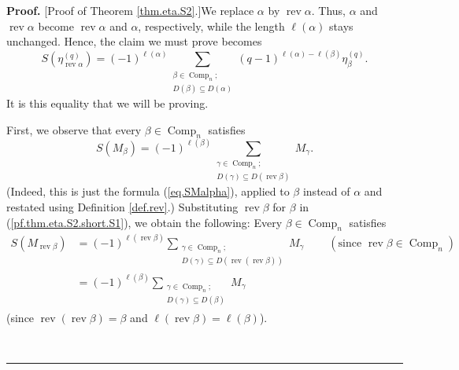 \documentclass[numbers=enddot,12pt,final,onecolumn,notitlepage]{scrartcl}%
\theoremstyle{definition}
\newenvironment{proof}[1][Proof]{\noindent\textbf{#1.} }{\ \rule{0.5em}{0.5em}}
\let\sumnonlimits\sum
\renewcommand{\sum}{\sumnonlimits\limits}
\newenvironment{vershort}{}{}
\begin{document}
\begin{vershort}


\begin{proof}
[Proof of Theorem \ref{thm.eta.S2}.]We replace $\alpha$ by
$\operatorname*{rev}\alpha$. Thus, $\alpha$ and $\operatorname*{rev}\alpha$
become $\operatorname*{rev}\alpha$ and $\alpha$, respectively, while the
length $\ell\left(  \alpha\right)  $ stays unchanged. Hence, the claim we must
prove becomes%
\begin{equation}
S\left(  \eta_{\operatorname*{rev}\alpha}^{\left(  q\right)  }\right)
=\left(  -1\right)  ^{\ell\left(  \alpha\right)  }\sum_{\substack{\beta
\in\operatorname*{Comp}\nolimits_{n};\\D\left(  \beta\right)  \subseteq
D\left(  \alpha\right)  }}\left(  q-1\right)  ^{\ell\left(  \alpha\right)
-\ell\left(  \beta\right)  }\eta_{\beta}^{\left(  q\right)  }.
\label{pf.thm.eta.S2.short.goal}%
\end{equation}
It is this equality that we will be proving.

First, we observe that every $\beta\in\operatorname*{Comp}\nolimits_{n}$
satisfies%
\begin{equation}
S\left(  M_{\beta}\right)  =\left(  -1\right)  ^{\ell\left(  \beta\right)
}\sum_{\substack{\gamma\in\operatorname*{Comp}\nolimits_{n};\\D\left(
\gamma\right)  \subseteq D\left(  \operatorname*{rev}\beta\right)  }%
}M_{\gamma}. \label{pf.thm.eta.S2.short.S1}%
\end{equation}
(Indeed, this is just the formula (\ref{eq.SMalpha}), applied to $\beta$
instead of $\alpha$ and restated using Definition \ref{def.rev}.) Substituting
$\operatorname*{rev}\beta$ for $\beta$ in (\ref{pf.thm.eta.S2.short.S1}), we
obtain the following: Every $\beta\in\operatorname*{Comp}\nolimits_{n}$
satisfies%
\begin{align}
S\left(  M_{\operatorname*{rev}\beta}\right)   &  =\left(  -1\right)
^{\ell\left(  \operatorname*{rev}\beta\right)  }\sum_{\substack{\gamma
\in\operatorname*{Comp}\nolimits_{n};\\D\left(  \gamma\right)  \subseteq
D\left(  \operatorname*{rev}\left(  \operatorname*{rev}\beta\right)  \right)
}}M_{\gamma}\ \ \ \ \ \ \ \ \ \ \left(  \text{since }\operatorname*{rev}%
\beta\in\operatorname*{Comp}\nolimits_{n}\right) \nonumber\\
&  =\left(  -1\right)  ^{\ell\left(  \beta\right)  }\sum_{\substack{\gamma
\in\operatorname*{Comp}\nolimits_{n};\\D\left(  \gamma\right)  \subseteq
D\left(  \beta\right)  }}M_{\gamma} \label{pf.thm.eta.S2.short.S2}%
\end{align}
(since $\operatorname*{rev}\left(  \operatorname*{rev}\beta\right)  =\beta$
and $\ell\left(  \operatorname*{rev}\beta\right)  =\ell\left(  \beta\right)  $).


\end{proof}
\end{vershort}
\end{document}
